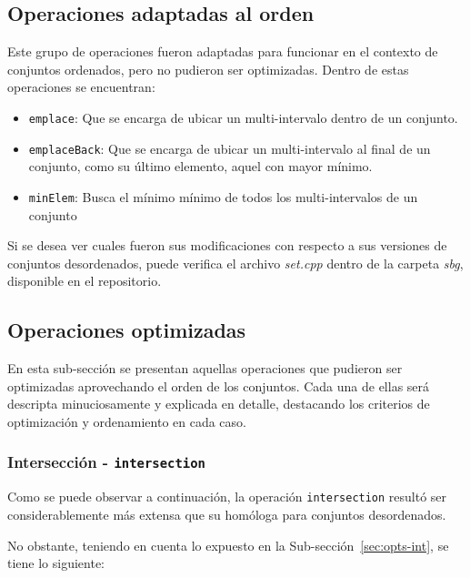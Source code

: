 \subsection{Operaciones adaptadas al orden}

Este grupo de operaciones fueron adaptadas para funcionar en el contexto de conjuntos ordenados, pero no pudieron ser optimizadas. Dentro de estas operaciones se encuentran:

\begin{itemize}
    \item \texttt{emplace}: Que se encarga de ubicar un multi-intervalo dentro de un conjunto.
    \item \texttt{emplaceBack}: Que se encarga de ubicar un multi-intervalo al final de un conjunto, como su último elemento, aquel con mayor mínimo.
    \item \texttt{minElem}: Busca el mínimo mínimo de todos los multi-intervalos de un conjunto
\end{itemize}

Si se desea ver cuales fueron sus modificaciones con respecto a sus versiones de conjuntos desordenados, puede verifica el archivo \textit{set.cpp} dentro de la carpeta \textit{sbg}, disponible en el repositorio.

\subsection{Operaciones optimizadas}

En esta sub-sección se presentan aquellas operaciones que pudieron ser optimizadas aprovechando el orden de los conjuntos. Cada una de ellas será descripta minuciosamente y explicada en detalle, destacando los criterios de optimización y ordenamiento en cada caso.

\subsubsection{Intersección - \texttt{intersection}}
Como se puede observar a continuación, la operación \texttt{intersection} resultó ser considerablemente más extensa que su homóloga para conjuntos desordenados.

No obstante, teniendo en cuenta lo expuesto en la Sub-sección~\ref{sec:opts-int}, se tiene lo siguiente:

